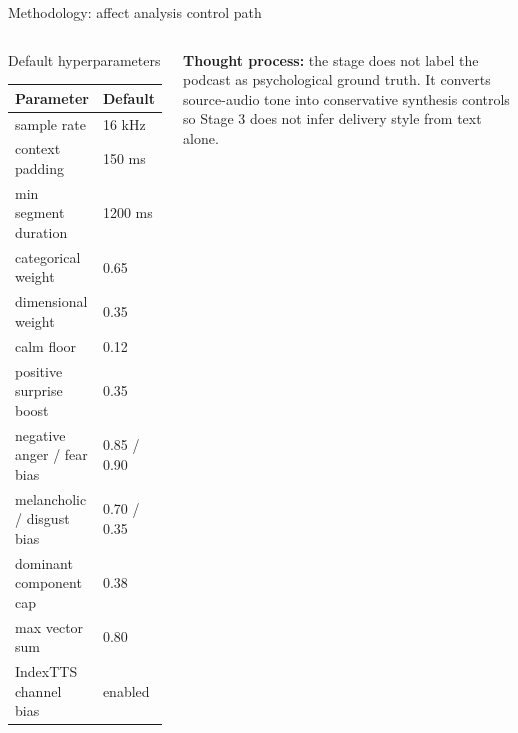 \documentclass[aspectratio=169,10pt]{beamer}
\begin{document}
\begin{frame}{Methodology: affect analysis control path}
\begin{columns}[T,totalwidth=\textwidth]
\begin{block}{Default hyperparameters}
{\fontsize{5.85}{6.35}\selectfont
\setlength{\tabcolsep}{2pt}
\renewcommand{\arraystretch}{1.02}
\begin{tabularx}{\linewidth}{p{2.8cm}Z}
\toprule
Parameter & Default \\
\midrule
sample rate & 16 kHz \\
context padding & 150 ms \\
min segment duration & 1200 ms \\
categorical weight & 0.65 \\
dimensional weight & 0.35 \\
calm floor & 0.12 \\
positive surprise boost & 0.35 \\
negative anger / fear bias & 0.85 / 0.90 \\
melancholic / disgust bias & 0.70 / 0.35 \\
dominant component cap & 0.38 \\
max vector sum & 0.80 \\
IndexTTS channel bias & enabled \\
\bottomrule
\end{tabularx}
}
\end{block}
\vspace{0.1em}
{\fontsize{5.9}{6.5}\selectfont\textbf{Thought process:} the stage does not label the podcast as psychological ground truth. It converts source-audio tone into conservative synthesis controls so Stage 3 does not infer delivery style from text alone.}
\end{columns}
\end{frame}
\end{document}
